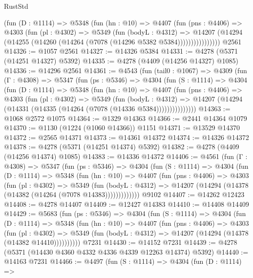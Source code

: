 \begin{lexlean}{RustStd}
\begin{coremodule}
{\begin{coremodule}
{{{{{{{{{{{{{{{{{{{{{{{{{{{{{{{{{{{              (fun (D : @1114) =>
              @5348
                (fun (hn : @10) =>
                @4407
                  (fun (pns : @4406) =>
                  @4303
                    (fun (pl : @4302) =>
                    @5349
                      (fun (bodyL : @4312) =>
                      @14207
                        (@14294 (@14255 (@14260 (@14264 (@7078 (@14296 @5382 @5384))))))))))))))))
    @2561
@14326 := @1057 @2561
@14327 := @14326 @5384
@14331 := @4278 (@5371 (@14251 @14327) @5392)
@14335 := @4278 (@4409 (@14256 @14327) @1085)
@14336 := @14296 @2561
@14361 := @4543
    (fun (tail0 : @1067) =>
    @4309
      (fun (Γ : @4308) =>
      @5347
        (fun (ps : @5346) =>
        @4304
          (fun (S : @1114) =>
          @4304
            (fun (D : @1114) =>
            @5348
              (fun (hn : @10) =>
              @4407
                (fun (pns : @4406) =>
                @4303
                  (fun (pl : @4302) =>
                  @5349
                    (fun (bodyL : @4312) =>
                    @14207 (@14294 (@14331 (@14335 (@14264 (@7078 (@14336 @5384)))))))))))))))
@14363 := @1068 @2572 @1075
@14364 := @1329 @14363
@14366 := @2441 @14364 @1079
@14370 := @1130 (@1224 (@1060 @14366)) @1151
@14371 := @13529 @14370
@14372 := @2565 @14371
@14373 := @14361 @14372
@14374 := @14326 @14372
@14378 := @4278 (@5371 (@14251 @14374) @5392)
@14382 := @4278 (@4409 (@14256 @14374) @1085)
@14383 := @14336 @14372
@14406 := @4561
    (fun (Γ : @4308) =>
    @5347
      (fun (ps : @5346) =>
      @4304
        (fun (S : @1114) =>
        @4304
          (fun (D : @1114) =>
          @5348
            (fun (hn : @10) =>
            @4407
              (fun (pns : @4406) =>
              @4303
                (fun (pl : @4302) =>
                @5349
                  (fun (bodyL : @4312) =>
                  @14207 (@14294 (@14378 (@14382 (@14264 (@7078 @14383)))))))))))))
    @9102
@14407 := @14262 @12423
@14408 := @4278 @14407
@14409 := @12427 @14383
@14410 := @14408 @14409
@14429 := @5683
    (fun (ps : @5346) =>
    @4304
      (fun (S : @1114) =>
      @4304
        (fun (D : @1114) =>
        @5348
          (fun (hn : @10) =>
          @4407
            (fun (pns : @4406) =>
            @4303
              (fun (pl : @4302) =>
              @5349 (fun (bodyL : @4312) => @14207 (@14294 (@14378 (@14382 @14410))))))))))
    @7231
@14430 := @14152 @7231
@14439 := @4278 (@5371 (@14430 @4360 @4332 @4336 @4339 @12263 @14374) @5392)
@14440 := @14163 @7231
@14466 := @4497
    (fun (S : @1114) =>
    @4304
      (fun (D : @1114) =>
}}}}}}}}}}}}}}}}}}}}}}}}}}}}}}}}}}}
\end{coremodule}}
\end{coremodule}
\end{lexlean}
